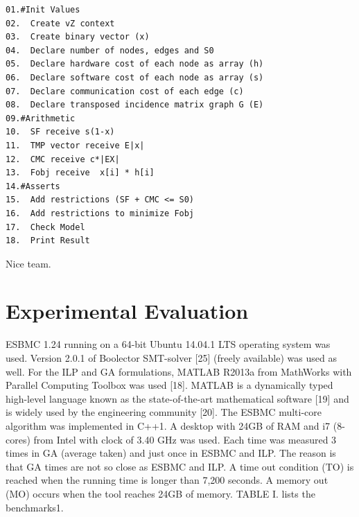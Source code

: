 \begin{lstlisting}
01.#Init Values
02.  Create vZ context 
03.  Create binary vector (x)
04.  Declare number of nodes, edges and S0
05.  Declare hardware cost of each node as array (h) 
06.  Declare software cost of each node as array (s)
07.  Declare communication cost of each edge (c)
08.  Declare transposed incidence matrix graph G (E)
09.#Arithmetic
10.  SF receive s(1-x)
11.  TMP vector receive E|x| 
12.  CMC receive c*|EX|
13.  Fobj receive  x[i] * h[i]
14.#Asserts
15.  Add restrictions (SF + CMC <= S0)
16.  Add restrictions to minimize Fobj
17.  Check Model
18.  Print Result
\end{lstlisting}

Nice team.

\section{Experimental Evaluation}
ESBMC 1.24 running on a 64-bit Ubuntu 14.04.1 LTS operating system was used. Version 2.0.1 of Boolector SMT-solver [25] (freely available) was used as well. For the ILP and GA formulations, MATLAB R2013a from MathWorks with Parallel Computing Toolbox was used [18]. MATLAB is a dynamically typed high-level language known as the state-of-the-art mathematical software [19] and is widely used by the engineering community [20]. The ESBMC multi-core algorithm was implemented in C++1. A desktop with 24GB of RAM and i7 (8-cores) from Intel with clock of 3.40 GHz was used. Each time was measured 3 times in GA (average taken) and just once in ESBMC and ILP. The reason is that GA times are not so close as ESBMC and ILP. A time out condition (TO) is reached when the running time is longer than 7,200 seconds. A memory out (MO) occurs when the tool reaches 24GB of memory. TABLE I. lists the benchmarks1.


